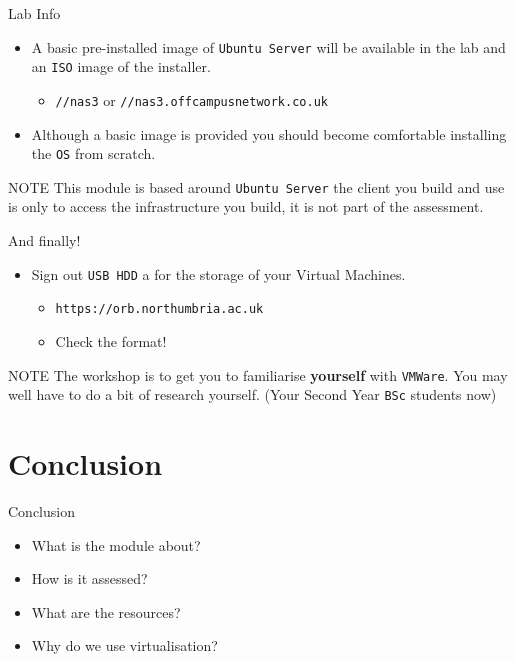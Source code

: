 \documentclass{beamer}
\begin{document}
\begin{frame}{Lab Info}
  \begin{itemize}
    \item A basic pre-installed image of \texttt{Ubuntu Server} will be available in the lab and an \texttt{ISO} image of the installer. 
      \begin{itemize}
        \item \texttt{//nas3} or \texttt{//nas3.offcampusnetwork.co.uk} 
      \end{itemize}
    \item Although a basic image is provided you should become comfortable installing the \texttt{OS} from scratch.
  \end{itemize}
  \begin{block}{NOTE}
    This module is based around \texttt{Ubuntu Server} the client you build and use is only to access the infrastructure you build, it is not part of the assessment.
  \end{block}
\end{frame}

\begin{frame}{And finally!}
  \begin{itemize}
    \item Sign out \texttt{USB HDD} a for the storage of your Virtual Machines.
      \begin{itemize}
        \item \texttt{https://orb.northumbria.ac.uk} 
        \item Check the format!
      \end{itemize}
  \end{itemize}
  \begin{block}{NOTE}
    The workshop is to get you to familiarise \textbf{yourself} with \texttt{VMWare}. You may well have to do a bit of research yourself. (Your Second Year \texttt{BSc} students now)
  \end{block}
\end{frame}



\section*{Conclusion}
\begin{frame}{Conclusion}
  \begin{itemize}
    \item What is the module about?
    \item How is it assessed?
    \item What are the resources?
    \item Why do we use virtualisation?
  \end{itemize}
\end{frame}
\end{document}
